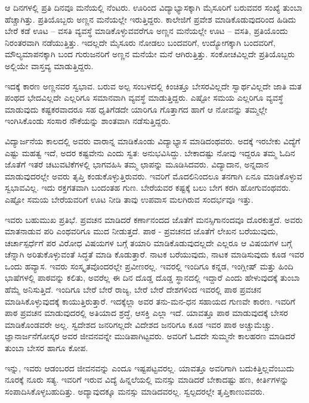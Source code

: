 ಆ ದಿನಗಳಲ್ಲಿ ಪ್ರತಿ ದಿನವೂ ಮನೆಯಲ್ಲಿ ನೆಂಟರು. ಊರಿಂದ ವಿದ್ಯಾಭ್ಯಾಸಕ್ಕಾಗಿ ಮೈಸೂರಿಗೆ ಬರುವವರ ಸಂಖ್ಯೆ ತುಂಬಾ ಹೆಚ್ಚಾಗಿತ್ತು.  ಪ್ರತಿಯೊಬ್ಬರು ಅಣ್ಣನ ಮನೆಯಲ್ಲೇ ಇರುತ್ತಿದ್ದರು.  ಕಾಲೇಜಿಗೆ ಪ್ರವೇಶ ಮಾಡಿಕೊಡುವುದರಿಂದ ಹಿಡಿದು ಬೇರೆ ಕಡೆ ಊಟ – ವಸತಿ ವ್ಯವಸ್ಥೆ ಮಾಡಿಕೊಳ್ಳುವವರೆಗೂ ಅಣ್ಣನ ಮನೆಯಲ್ಲೇ ಊಟ – ವಸತಿ, ಪ್ರತಿಯೊಂದು ನಿರಂತರವಾಗಿ ನಡೆಯುತ್ತಿತ್ತು.  ಇದಲ್ಲದೇ ಮೈಸೂರು ನೋಡಲು ಬಂದವರಿಗೆ, ಉದ್ಯೋಗಕ್ಕಾಗಿ ಬಂದವರಿಗೆ, ಮೌಲ್ಯಮಾಪನಕ್ಕಾಗಿ ಬಂದ ಗುರುಜನರಿಗೆ ಅಣ್ಣನ ಮನೆಯೇ  ಮನೆ ಆಗಿರುತ್ತಿತ್ತು.  ಸಂಕೋಚವಿಲ್ಲದೇ  ಪ್ರತಿಯೊಬ್ಬರು ಅಲ್ಲಿಯೇ ವಾಸ್ತವ್ಯ ಮಾಡುತ್ತಿದ್ದರು.  

ಇದಕ್ಕೆ ಕಾರಣ ಅಣ್ಣನವರ ಸ್ವಭಾವ. ಬರುವ ಅಲ್ಪ ಸಂಬಳದಲ್ಲಿ ಕಿಂಚಿತ್ತೂ ಬೇಸರವಿಲ್ಲದೇ ಸ್ವಾರ್ಥವಿಲ್ಲದೇ ಜಾತಿ ಮತ ಪಂಥದ ಭೇದವಿಲ್ಲದೇ ಎಲ್ಲರಿಗೂ ಸಮಾನವಾಗಿ ವ್ಯವಸ್ಥೆ ಮಾಡುತ್ತಿದ್ದರು.  ಎಷ್ಟೋ ಸಮಯ ಎಲ್ಲರಿಗೂ ವ್ಯವಸ್ಥೆ ಮಾಡುವುದು ಕಷ್ಟಕರವಾದರೂ ಸಹ ಧೃತಿಗೆಡದೇ ಯಾರಿಗೂ ಗೊತ್ತಾಗದ ಹಾಗೆ ಆ ನೋವನ್ನು ತಮ್ಮಲ್ಲೇ ಇಂಗಿಸಿಕೊಂಡು ಸಂಸಾರ ನೌಕೆಯನ್ನು ಶಾಂತವಾಗಿ ನಡೆಸುತ್ತಿದ್ದರು.

ವಿದ್ಯಾರ್ಜನೆಯ ಕಾಲದಲ್ಲಿ ಅವರು ವಾರಾನ್ನ ಮಾಡಿಕೊಂಡು ವಿದ್ಯಾಭ್ಯಾಸ ಮಾಡಿದಂಥವರು.  ಅದಕ್ಕೆ ಇರಬೇಕು ವಿದ್ಯೆಗೆ ಎಷ್ಟು ಮಹತ್ವ ಇದೆ, ಅದರ ಕಷ್ಟವೇನು ಎಂದು ಸ್ವತ: ಅನುಭವಿಸಿದ್ದು.  ಬೇಕಾದಷ್ಟು ನೋವು ಇದ್ದರೂ ತಮ್ಮ ಓದಿನ ಜೊತೆಗೆ ಇತರೆ ಚಟುವಟಿಕೆಗಳಲ್ಲಿ ಭಾಗವಹಿಸಿ ತಮ್ಮ ಛಾಪನ್ನು ಮೂಡಿಸಿದವರು.  ವಿದ್ಯಾದಾನ, ಅನ್ನದಾನ ಮಾಡುವುದರಲ್ಲೇ ಅವರು ತೃಪ್ತಿ ಕಂಡುಕೊಳ್ಳುತ್ತಿರುವರು.  ಇವರಿಗೆ ಮೊದಲಿನಿಂದಲೂ ತನಗಾಗಿ ಏನೂ ಮಾಡಿಕೊಳ್ಳುವ ಸ್ವಭಾವವಿಲ್ಲ. ಇದು ರಕ್ತಗತವಾಗಿ ಬಂದಂತಹ ಗುಣ. ಬೇರೆಯವರ ಕಷ್ಟಕ್ಕೆ ಬಲು ಬೇಗ ಕರಗಿ ಹೋಗುವಂಥವರು. ಎಷ್ಟೋ ಸಮಯ ಬೇರೆಯವರಿಗೆ ಊಟ ನೀಡಿ ತಾವು ಉಪವಾಸ ಮಲಗಿರುವ ಸಂದರ್ಭವೂ ಇತ್ತು.  

ಇವರು ಬಹುಮುಖ ಪ್ರತಿಭೆ.   ಪ್ರವಚನ ಮಾಡಿದರೆ ಕರ್ಣಾನಂದದ ಜೊತೆಗೆ ಮನಸ್ಸಿಗಾನಂದವೂ ದೊರಕುತ್ತದೆ.  ಅವರು ಮಾತನಾಡುವ ಪರಿ ಎಂಥವರಿಗೂ ಮುದ ನೀಡುತ್ತದೆ.  ಪಾಠ - ಪ್ರವಚನದ ಜೊತೆಗೆ ಲೇಖನ ಬರೆಯುವುದು, ಚರ್ಚಾಸ್ಪರ್ಧೆಗೆ ಪರ ವಿರೋಧ ವಿಷಯಗಳ ಬಗ್ಗೆ ತಯಾರಿ ಮಾಡಿಕೊಡುವುದಲ್ಲದೇ ಎಲ್ಲರೂ ಆ ವಿಷಯಗಳ ಬಗ್ಗೆ ಚೆನ್ನಾಗಿ ಅರಿತುಕೊಳ್ಳುವಂತೆ ಸಿದ್ಧತೆ ಮಾಡಿ ಕೊಡುತ್ತಾರೆ. ನಾಟಕ ಬರೆಯುವುದು, ನಾಟಕ ಮಾಡಿಸುವುದು ಕೂಡ ಇವರ ಒಂದು ಹವ್ಯಾಸ. ಇವರು ಸಂಸ್ಕೃತವೊಂದರಲ್ಲೇ ಪ್ರವೀಣರಲ್ಲ. ಇವರಲ್ಲಿ ಇಂದಿಗೂ ಕನ್ನಡ, ಇಂಗ್ಲೀಷ್ ಮತ್ತು ಹಿಂದಿ ಭಾಷೆಗಳಲ್ಲಿ ಪಾಠವನ್ನು ಕಲಿತು, ಅವರೆಲ್ಲ ಈ ದಿನ ದೊಡ್ಡ ದೊಡ್ಡ ಸ್ಥಾನದಲ್ಲಿ ಇದ್ದಾರೆ ಎಂದು ಹೇಳುವುದಕ್ಕೆ ತುಂಬಾ ಹೆಮ್ಮೆ ಅನಿಸುತ್ತಿದೆ. ಇಂದಿಗೂ ಬೇರೆ ಬೇರೆ ರಾಜ್ಯ, ಬೇರೆ ಬೇರೆ ದೇಶಗಳಿಂದ ಇವರಲ್ಲಿ ಪಾಠ ಪ್ರವಚನ ಮಾಡಿಸಿಕೊಳ್ಳುವುದಕ್ಕೆ  ಕಾಯುತ್ತಿರುತ್ತಾರೆ.  ಇದಕ್ಕೆಲ್ಲಾ ಅವರ ತನು-ಮನ-ಧನ ಸಹಾಯದ ಗುಣವೇ ಕಾರಣ.  ಇವರಿಗೆ ಪಾಠ ಪ್ರವಚನ ಮಾಡುವುದರಲ್ಲಿ ಅತಿಯಾದ ಶ್ರದ್ಧೆ, ಆಸಕ್ತಿ ಎಲ್ಲಾ ಇದೆ.  ಯಾವತ್ತೂ ಪಾಠ ಮಾಡುವುದಕ್ಕೆ ಬೇಸರ ಮಾಡಿಕೊಂಡವರೇ ಅಲ್ಲ. ಸ್ವದೇಶದ ಜನರಿಗಲ್ಲದೇ ವಿದೇಶದ ಜನರಿಗೂ ಕೂಡ ಇವರ ಪಾಠ ಅಚ್ಚುಮೆಚ್ಚು. ಜ್ಞಾನಾರ್ಜನೆಗೋಸ್ಕರ  ಅವರ  ಜೀವನವನ್ನೇ ಮುಡಿಪಾಗಿಟ್ಟವರು.  ಅವರಿಗೆ ಓದದೇ ಸುಮ್ಮನೇ ಕಾಲಹರಣ ಮಾಡಿದರೆ ತುಂಬಾ ಬೇಸರ ಹಾಗೂ ಕೋಪ. 

ಇನ್ನು, ಇವರು ಆಡಂಬರದ ಜೀವನವನ್ನು ಎಂದೂ ಇಷ್ಟಪಟ್ಟವರಲ್ಲ. ಯಾವತ್ತೂ ಅವರಿಗಾಗಿ ಬದುಕಿತ್ತಿಲ್ಲವೆಂಬುದು ನೂರಕ್ಕೆ ನೂರು ಸತ್ಯ. ಇವರಿಗೆ ಇರುವ ವಿದ್ಯೆ ಹಿನ್ನಲೆಯಲ್ಲಿ ಮನಸ್ಸು ಮಾಡಿದರೆ ಬೇಕಾದಷ್ಟು ಹಣ, ಕೀರ್ತಿಗಳನ್ನು ಸಂಪಾದಿಸಿಕೊಳ್ಳಬಹುದಿತ್ತು.  ಅದ್ಯಾವುದಕ್ಕೂ ಮನಸ್ಸು ಮಾಡಿದವರಲ್ಲ.  ಸ್ವಲ್ಪದರಲ್ಲೇ ತೃಪ್ತಿಕಾಣುವವರು. 

